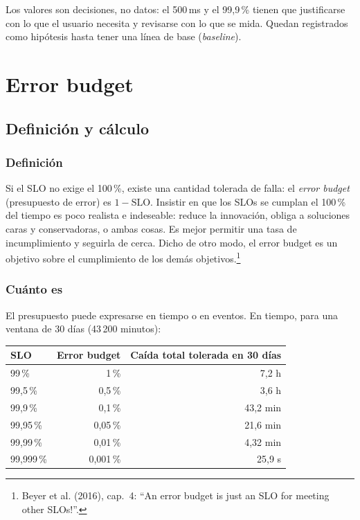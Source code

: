 \documentclass[variant=apuntes,cover=institutional,mode=screen]{ua-engineering-v6-article}
\begin{document}
Los valores son decisiones, no datos: el 500\,ms y el 99,9\,\% tienen que justificarse con lo que el usuario necesita y revisarse con lo que se mida. Quedan registrados como hipótesis hasta tener una línea de base (\emph{baseline}).

\section{Error budget}\label{sec:budget}

\subsection{Definición y cálculo}

\subsubsection{Definición}

Si el SLO no exige el 100\,\%, existe una cantidad tolerada de falla: el \emph{error budget} (presupuesto de error) es $1 - \text{SLO}$. Insistir en que los SLOs se cumplan el 100\,\% del tiempo es poco realista e indeseable: reduce la innovación, obliga a soluciones caras y conservadoras, o ambas cosas. Es mejor permitir una tasa de incumplimiento y seguirla de cerca. Dicho de otro modo, el error budget es un objetivo sobre el cumplimiento de los demás objetivos.\footnote{Beyer et al. (2016), cap.~4: ``An error budget is just an SLO for meeting other SLOs!''.}

\subsubsection{Cuánto es}

El presupuesto puede expresarse en tiempo o en eventos. En tiempo, para una ventana de 30 días (43\,200 minutos):

\begin{center}
\begin{tabular}{lrr}
\toprule
\textbf{SLO} & \textbf{Error budget} & \textbf{Caída total tolerada en 30 días} \\
\midrule
99\,\% & 1\,\% & 7,2 h \\
99,5\,\% & 0,5\,\% & 3,6 h \\
99,9\,\% & 0,1\,\% & 43,2 min \\
99,95\,\% & 0,05\,\% & 21,6 min \\
99,99\,\% & 0,01\,\% & 4,32 min \\
99,999\,\% & 0,001\,\% & 25,9 s \\
\bottomrule
\end{tabular}
\end{center}
\end{document}
